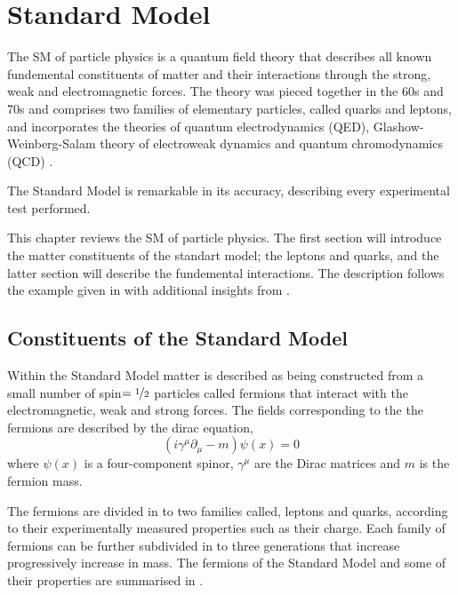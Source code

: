 \chapter{Standard Model}
\label{chap:sm}
The {SM} of particle physics is a quantum field theory that describes all
known fundemental constituents of matter and their interactions through the
strong, weak and electromagnetic forces.
The theory was pieced together in the 60s and 70s and comprises two families of
elementary particles, called quarks and leptons, and incorporates the theories
of quantum electrodynamics (QED), Glashow-Weinberg-Salam theory of electroweak
dynamics and quantum chromodynamics (QCD)
\cite{t1972regularization, glashow1961partial, weinberg1967model,
salam1968weak}.

The Standard Model is remarkable in its accuracy, describing every experimental
test performed.  

This chapter reviews the {SM} of particle physics. The first section will 
introduce the matter constituents of the standart model; the leptons and quarks,
and the latter section will describe the fundemental interactions. 
The description follows the example given in \cite{ral} with additional insights
from \cite{perkins2000introduction,griffiths2008introduction,halzen1984quarks}.

\section{Constituents of the Standard Model}
\label{sec:matter}
Within the Standard Model matter is described as being constructed from a small
number of spin$=\nicefrac{1}{2}$ particles called fermions that interact with
the electromagnetic, weak and strong forces. 
The fields corresponding to the the fermions are described by the dirac
equation,
\begin{equation}
\left( i \gamma^{\mu} \partial_{\mu} - m \right) \psi(x) = 0
\end{equation}
where $\psi(x)$ is a four-component spinor, $\gamma^{\mu}$ are the Dirac
matrices and $m$ is the fermion mass.

The fermions are divided in to two families called, leptons and quarks,
according to their experimentally measured properties such as their charge.
Each family of fermions can be further subdivided in to three generations that
increase progressively increase in mass. The fermions of the Standard Model and
some of their properties are summarised in .

